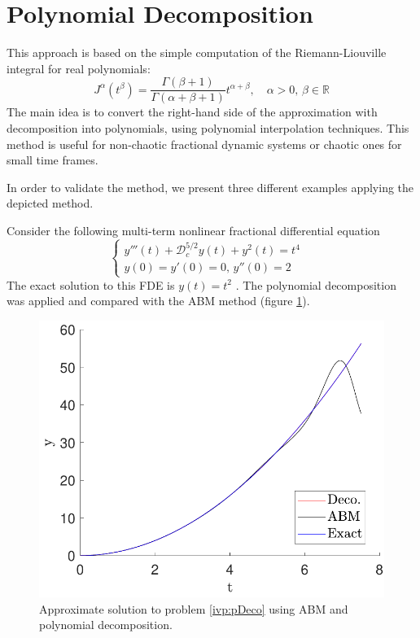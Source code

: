 \section{Polynomial Decomposition}
This approach is based on the simple computation of the Riemann-Liouville integral for real polynomials:
\begin{equation}
  J^{\alpha}\left(t^{\beta}\right)=\dfrac{\Gamma(\beta+1)}{\Gamma(\alpha+\beta+1)}t^{\alpha+\beta},\quad \alpha>0,\,\beta\in\mathbb{R}
\end{equation}
The main idea is to convert the right-hand side of the approximation with decomposition into polynomials, using polynomial interpolation techniques. This method is useful for non-chaotic fractional dynamic systems or chaotic ones for small time frames.

In order to validate the method, we present three different examples applying the depicted method.

Consider the following multi-term nonlinear fractional differential equation
\begin{equation}\label{ivp:pDeco}
    \begin{cases}
        y'''(t)+\mathcal{D}_c^{5/2}y(t)+y^2(t)=t^4&\\
        y(0)=y'(0)=0,\,y''(0)=2
    \end{cases}
\end{equation}
The exact solution to this FDE is $y(t)=t^2$ \cite{saadatmandi2010new}. The polynomial decomposition was applied and compared with the ABM method (figure \ref{fig:pDeco_exact}).

\begin{figure}
    \centering
    \includegraphics[scale=.5]{files/ABM-vs-Deco-Exact.pdf}
    \caption{Approximate solution to problem \ref{ivp:pDeco} using ABM and polynomial decomposition.}
    \label{fig:pDeco_exact}
\end{figure}
